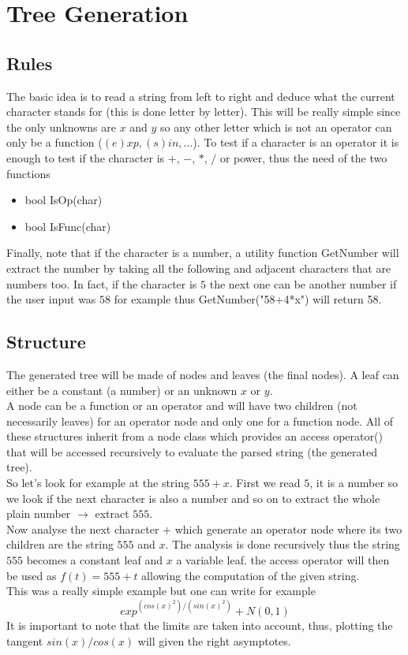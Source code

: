 \documentclass[a4paper]{report}
\begin{document}
\section{Tree Generation}
\subsection{Rules}
The basic idea is to read a string from left to right and deduce what the current character stands for (this is done letter by letter).
This will be really simple since the only unknowns are $x$ and $y$ so any other letter which is not an operator can only be a function ($(e)xp,(s)in,...$).
To test if a character is an operator it is enough to test if the character is $+$, $-$, $*$, $/$ or power, thus the need of the two functions

\begin{itemize}
\item bool IsOp(char)
\item bool IsFunc(char)
\end{itemize}

Finally, note that if the character is a number, a utility function GetNumber will extract the number by taking all the following and adjacent characters that are numbers too. In fact, if the character is $5$ the next one can be another number if the user input was $58$ for example thus GetNumber("58+4*x") will return 58.\\
\subsection{Structure}
The generated tree will be made of nodes and leaves (the final nodes). A leaf can either be a constant (a number) or an unknown $x$ or $y$.\\
A node can be a function or an operator and will have two children (not necessarily leaves) for an operator node and only one for a function node. All of these structures inherit from a node class which provides an access operator() that will be accessed recursively to evaluate the parsed string (the generated tree).
\\



So let's look for example at the string $555+x$.
First we read $5$, it is a number so we look if the next character is also a number and so on to extract the whole plain number $\rightarrow$ extract $555$. \\
Now analyse the next character $+$ which generate an operator node where its two children are the string $555$ and $x$. The analysis is done recursively thus the string $555$ becomes a constant leaf and $x $ a variable leaf.
the access operator will then be used as $f(t)=555+t$ allowing the computation of the given string.\\
This was a really simple example but one can write for example
\[exp^{(cos(x)^2)/(sin(x)^2)}+N(0,1)
\]
It is important to note that the limits are taken into account, thus, plotting the tangent $sin(x)/cos(x)$ will given the right asymptotes.
\end{document}
